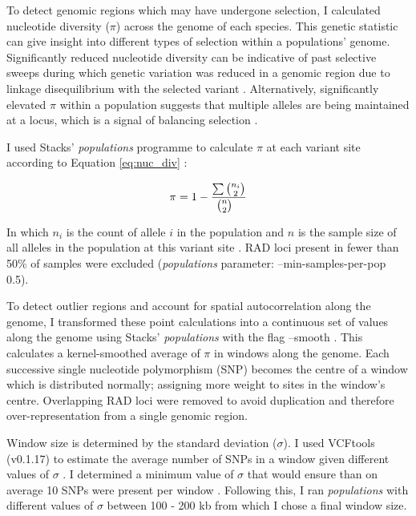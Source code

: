 \documentclass[12pt]{article}
\begin{document}
\begin{linenumbers}
		To detect genomic regions which may have undergone selection, I calculated nucleotide diversity ($\pi$) across the genome of each species. This genetic statistic can give insight into different types of selection within a populations' genome. Significantly reduced nucleotide diversity can be indicative of past selective sweeps during which genetic variation was reduced in a genomic region due to linkage disequilibrium with the selected variant \citep{hohenlohe_population_2012, mollion_patterns_2017, pracana_fire_2017}. Alternatively, significantly elevated $\pi$ within a population suggests that multiple alleles are being maintained at a locus, which is a signal of balancing selection \citep{davey_radseq_2010, hohenlohe_using_2010}.
		
		I used Stacks' \emph{populations} programme to calculate $\pi$ at each variant site according to Equation \ref{eq:nuc_div} \citep{catchen_stacks_2013}:
		
		\begin{equation}
			\pi = 1 - \frac{\sum{n_i \choose 2} \\~\\}{{n \choose 2} \\~\\}
			\label{eq:nuc_div}
		\end{equation}
		
		In which $n_i$ is the count of allele $i$ in the population and $n$ is the sample size of all alleles in the population at this variant site \citep{hohenlohe_population_2010}. RAD loci present in fewer than 50\% of samples were excluded (\emph{populations} parameter: --min-samples-per-pop 0.5). 
		
		To detect outlier regions and account for spatial autocorrelation along the genome, I transformed these point calculations into a continuous set of values along the genome using Stacks' \emph{populations} with the flag --smooth \citep{catchen_stacks_2013}.
		This calculates a kernel-smoothed average of $\pi$ in windows along the genome. Each successive single nucleotide polymorphism (SNP) becomes the centre of a window which is distributed normally; assigning more weight to sites in the window's centre. Overlapping RAD loci were removed to avoid duplication and therefore over-representation from a single genomic region. 
		
		Window size is determined by the standard deviation ($\sigma$). I used VCFtools (v0.1.17) to estimate the average number of SNPs in a window given different values of $\sigma$ \citep{danecek_variant_2011}. I determined a minimum value of $\sigma$ that would ensure than on average 10 SNPs were present per window \citep{buckley_restriction_2018}. Following this, I ran \emph{populations} with different values of $\sigma$ between 100 - 200 kb from which I chose a final window size. 
		

\end{linenumbers}
\end{document}
